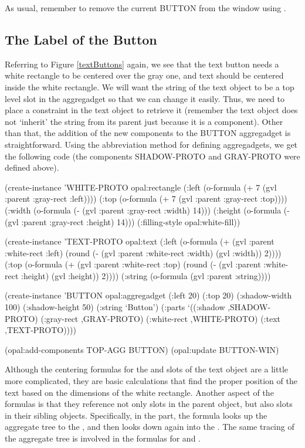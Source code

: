 As usual, remember to remove the current BUTTON from the window using
.


\subsection{The Label of the Button}

Referring to Figure \ref{textButtons} again, we see that the text
button needs a white rectangle to be centered over the gray one, and text
should be centered inside the white rectangle.  We will want the string of
the text object to be a top level slot in the aggregadget so that we
can change it easily.  Thus, we need to place a constraint in the text
object to retrieve it (remember the text object does not `inherit' the
string from its parent just because it is a component).  Other than
that, the addition of the new
components to the BUTTON aggregadget is straightforward.  Using the
abbreviation method for defining aggregadgets, we get the following code
(the components SHADOW-PROTO and GRAY-PROTO were defined above).

\begin{programexample}
(create-instance 'WHITE-PROTO opal:rectangle
   (:left (o-formula (+ 7 (gvl :parent :gray-rect :left))))
   (:top (o-formula (+ 7 (gvl :parent :gray-rect :top))))
   (:width (o-formula (- (gvl :parent :gray-rect :width) 14)))
   (:height (o-formula (- (gvl :parent :gray-rect :height) 14)))
   (:filling-style opal:white-fill))

(create-instance 'TEXT-PROTO opal:text
   (:left (o-formula (+ (gvl :parent :white-rect :left)
			(round (- (gvl :parent :white-rect :width)
				  (gvl :width))
			       2))))
   (:top (o-formula (+ (gvl :parent :white-rect :top)
		       (round (- (gvl :parent :white-rect :height)
				 (gvl :height))
			      2))))
   (:string (o-formula (gvl :parent :string))))

(create-instance 'BUTTON opal:aggregadget
   (:left 20) (:top 20)
   (:shadow-width 100) (:shadow-height 50)
   (:string `Button')
   (:parts
    `((:shadow ,SHADOW-PROTO)
      (:gray-rect ,GRAY-PROTO)
      (:white-rect ,WHITE-PROTO)
      (:text ,TEXT-PROTO))))

(opal:add-components TOP-AGG BUTTON)
(opal:update BUTTON-WIN)
\end{programexample}

Although the centering formulas for the  and  slots
of the text object are a little more complicated, they are basic
calculations that find the proper position of the text based on the
dimensions of the white rectangle.  Another aspect of the formulas is
that they reference not only slots in the parent object, but also
slots in their sibling objects.  Specifically, in the 
part, the  formula looks up the aggregate tree to the
, and then looks down again into the .  The
same tracing of the aggregate tree is involved in the 
formulas for  and .


